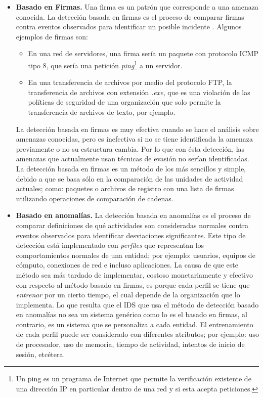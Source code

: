 \begin{itemize}
	\item \textbf{Basado en Firmas.}
	Una firma es un patrón que corresponde a una amenaza conocida. La detección basada en firmas es el proceso de comparar firmas contra eventos observados para identificar un posible incidente \cite{nist94}. Algunos ejemplos de firmas son:
	\begin{itemize}
		\item En una red de servidores, una firma sería un paquete con protocolo ICMP tipo 8, que sería una petición \textit{ping}\footnote{Un ping es un programa de Internet que permite la verificación existente de una dirección IP en particular dentro de una red y si esta acepta peticiones.} a un servidor.\\
		
		\item En una transferencia de archivos por medio del protocolo FTP, la transferencia de archivos con extensión \textit{.exe}, que es una violación de las políticas de seguridad de una organización que solo permite la transferencia de archivos de texto, por ejemplo.\\
	\end{itemize}
	
	La detección basada en firmas es muy efectiva cuando se hace el análisis sobre amenazas conocidas, pero es inefectiva si no se tiene identificada la amenaza previamente o no su estructura cambia. Por lo que con ésta detección, las amenazas que actualmente usan técnicas de evasión no serían identificadas.\\
	
	La detección basada en firmas es un método de los más sencillos y simple, debido a que se basa sólo en la comparación de las unidades de actividad actuales; como: paquetes o archivos de registro con una lista de firmas utilizando operaciones de comparación de cadenas.\\
	
	
	\item \textbf{Basado en anomalías.}
	La detección basada en anomalías es el proceso de comparar definiciones de qué actividades son consideradas normales contra eventos observados para identificar desviaciones significantes\cite{nist94}. Este tipo de detección está implementado con \textit{perfiles} que representan los comportamientos normales de una entidad; por ejemplo: usuarios, equipos de cómputo, conexiones de red e incluso aplicaciones. La causa de que este método sea más tardado de implementar, costoso monetariamente y efectivo con respecto al método basado en firmas, es porque cada perfil se tiene que \textit{entrenar} por un cierto tiempo, el cual depende de la organización que lo implementa. Lo que resulta que el IDS que usa el método de detección basado en anomalías no sea un sistema genérico como lo es el basado en firmas, al contrario, es un sistema que se personaliza a cada entidad. El entrenamiento de cada perfil puede ser considerado con diferentes atributos; por ejemplo: uso de procesador, uso de memoria, tiempo de actividad, intentos de inicio de sesión, etcétera.\\
	

\end{itemize}
